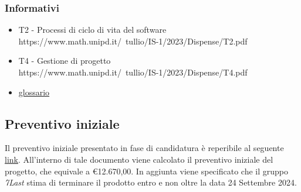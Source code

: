     \subsubsection{Informativi}
        \begin{itemize}
            \item T2 - Processi di ciclo di vita del software\\ https://www.math.unipd.it/~tullio/IS-1/2023/Dispense/T2.pdf
            \item T4 - Gestione di progetto\\ https://www.math.unipd.it/~tullio/IS-1/2023/Dispense/T4.pdf
            \item \href{https://7last.github.io/docusaurus/docs/rtb/glossario#glossario-1}{glossario}
        \end{itemize}
\subsection{Preventivo iniziale}
Il preventivo iniziale presentato in fase di candidatura è reperibile al seguente \uline{\href{https://github.com/7Last/docs/blob/main/1_candidatura/preventivo_costi_assunzione_impegni_v2.0.pdf}{link}}. All'interno di tale documento viene calcolato il preventivo iniziale del progetto, che equivale a €12.670,00. In aggiunta viene specificato che il gruppo \textit{7Last} stima di terminare il prodotto entro e non oltre la data 24 Settembre 2024.
